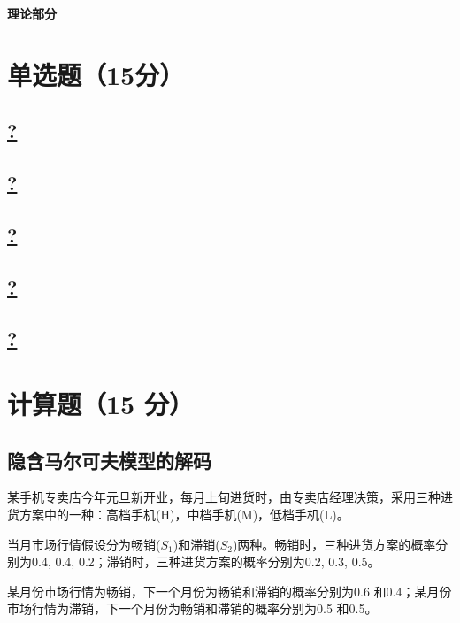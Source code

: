 \documentclass[a4paper]{article}
\begin{document}
\courseheader
{}
\vspace{3mm}
\centerline{\textbf{\Large{理论部分}}}

\section{单选题（15分）}
\subsection{\underline{?}}

\subsection{\underline{?}}

\subsection{\underline{?}}

\subsection{\underline{?}}

\subsection{\underline{?}}

\section{计算题（15 分）}
\subsection{隐含马尔可夫模型的解码}

\hspace{2em}某手机专卖店今年元旦新开业，每月上旬进货时，由专卖店经理决策，采用三种进货方案中的一种：高档手机(H)，中档手机(M)，低档手机(L)。

\hspace{2em}当月市场行情假设分为畅销($S_1$)和滞销($S_2$)两种。畅销时，三种进货方案的概率分别为0.4, 0.4, 0.2；滞销时，三种进货方案的概率分别为0.2, 0.3, 0.5。

\hspace{2em}某月份市场行情为畅销，下一个月份为畅销和滞销的概率分别为0.6 和0.4；某月份市场行情为滞销，下一个月份为畅销和滞销的概率分别为0.5 和0.5。
\end{document}
